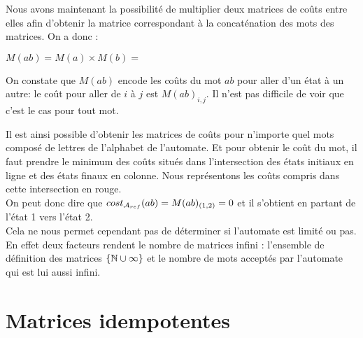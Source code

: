 \documentclass[12pt]{memoir}
\begin{document}
Nous avons maintenant la possibilité de multiplier deux matrices de coûts entre elles afin d'obtenir la matrice correspondant à la concaténation des mots des matrices. On a donc :
\begin{center}
$M(ab) = M(a) \times M(b) =$
\end{center}
On constate que $M(ab)$ encode les coûts du mot $ab$ pour aller d'un état à un
autre: le coût pour aller de $i$ à $j$ est $M(ab)_{i,j}$. Il n'est pas
difficile de voir que c'est le cas pour tout mot.

Il est ainsi possible d'obtenir les matrices de coûts pour n'importe quel mots composé de lettres de l'alphabet de l'automate. Et pour obtenir le coût du mot, il faut prendre le minimum des coûts situés dans l'intersection des états initiaux en ligne et des états finaux en colonne. Nous représentons les coûts compris dans cette intersection en rouge.\\
On peut donc dire que $cost_{\mathcal{A}_{ref}}(ab) = M(ab)_{(1,2)} = 0$ et il s'obtient en partant de l'état 1 vers l'état 2.\\

Cela ne nous permet cependant pas de déterminer si l'automate est limité ou pas. En effet deux facteurs rendent le nombre de matrices infini : l'ensemble de définition des matrices $\{\mathbb{N} \cup \infty\}$ et le nombre de mots acceptés par l'automate qui est lui aussi infini.
\section{Matrices idempotentes}
\label{sec:matr-idemp}
\end{document}
